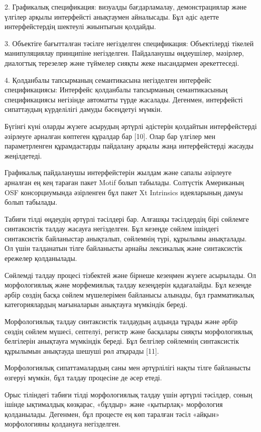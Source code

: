 2. Графикалық спецификация: визуалды бағдарламалау, демонстрациялар және
үлгілер арқылы интерфейсті анықтаумен айналысады. Бұл әдіс әдетте
интерфейстердің шектеулі жиынтығын қолдайды.

3. Объектіге бағытталған тәсілге негізделген спецификация: Объектілерді
тікелей манипуляциялау принципіне негізделген. Пайдаланушы өңдеушілер,
мәзірлер, диалогтық терезелер және түймелер сияқты жеке нысандармен
әрекеттеседі.

4. Қолданбалы тапсырманың семантикасына негізделген интерфейс
спецификациясы: Интерфейс қолданбалы тапсырманың семантикасының
спецификациясы негізінде автоматты түрде жасалады. Дегенмен, интерфейсті
сипаттаудың күрделілігі дамуды бәсеңдетуі мүмкін.

Бүгінгі күні оларды жүзеге асырудың әртүрлі әдістерін қолдайтын
интерфейстерді әзірлеуге арналған көптеген құралдар бар {[}10{]}. Олар
бар үлгілер мен параметрленген құрамдастарды пайдалану арқылы жаңа
интерфейстерді жасауды жеңілдетеді.

Графикалық пайдаланушы интерфейстерін жылдам және сапалы әзірлеуге
арналған ең кең тараған пакет Motif болып табылады. Солтүстік Американың
OSF консорциумында әзірленген бұл пакет Xt Intrinsics идеяларының дамуы
болып табылады.

Табиғи тілді өңдеудің әртүрлі тәсілдері бар. Алғашқы тәсілдердің бірі
сөйлемге синтаксистік талдау жасауға негізделген. Бұл кезеңде сөйлем
ішіндегі синтаксистік байланыстар анықталып, сөйлемнің түрі, құрылымы
анықталады. Ол үшін талданатын тілге байланысты арнайы лексикалық және
синтаксистік ережелер қолданылады.

Сөйлемді талдау процесі тізбектей және бірнеше кезеңмен жүзеге
асырылады. Ол морфологиялық және морфемиялық талдау кезеңдерін
қадағалайды. Бұл кезеңде әрбір сөздің басқа сөйлем мүшелерімен байланысы
алынады, бұл грамматикалық категориялардың мағыналарын анықтауға
мүмкіндік береді.

Морфологиялық талдау синтаксистік талдаудың алдында тұрады және әрбір
сөздің сөйлем мүшесі, септелуі, регистр және басқалары сияқты
морфологиялық белгілерін анықтауға мүмкіндік береді. Бұл белгілер
сөйлемнің синтаксистік құрылымын анықтауда шешуші рөл атқарады {[}11{]}.

Морфологиялық сипаттамалардың саны мен әртүрлілігі нақты тілге
байланысты өзгеруі мүмкін, бұл талдау процесіне де әсер етеді.

Орыс тіліндегі табиғи тілді морфологиялық талдау үшін әртүрлі тәсілдер,
соның ішінде ықтималдық көзқарас, «бұлдыр» және «қытырлақ» морфология
қолданылады. Дегенмен, бұл процесте ең көп таралған тәсіл «айқын»
морфологияны қолдануға негізделген.

